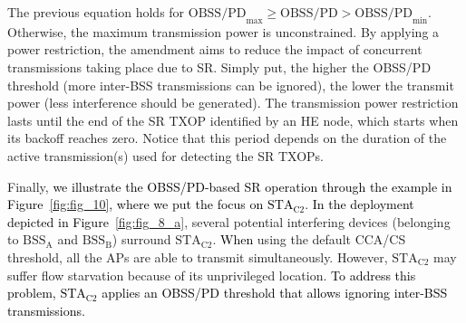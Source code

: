\documentclass[preprint,12pt]{elsarticle}
\theoremstyle{plain}
\begin{document}
The previous equation holds for $\text{OBSS/PD}_{\max} \geq \text{OBSS/PD} > \text{OBSS/PD}_{\min}$. Otherwise, the maximum transmission power is unconstrained. By applying a power restriction, the amendment aims to reduce the impact of concurrent transmissions taking place due to SR. Simply put, the higher the OBSS/PD threshold (more inter-BSS transmissions can be ignored), the lower the transmit power (less interference should be generated). The transmission power restriction lasts until the end of the SR TXOP identified by an HE node, which starts when its backoff reaches zero. Notice that this period depends on the duration of the active transmission(s) used for detecting the SR TXOPs. 

Finally, \textcolor{black}{we illustrate the OBSS/PD-based SR operation through the example in Figure~\ref{fig:fig_10}, where we put the focus on $\text{STA}_\text{C2}$}. \textcolor{black}{In the deployment depicted in Figure~\ref{fig:fig_8_a}}, several potential interfering devices (belonging to $\text{BSS}_\text{A}$ and $\text{BSS}_\text{B}$) surround $\text{STA}_\text{C2}$. \textcolor{black}{When} using the default CCA/CS threshold, all the APs are able to transmit simultaneously. However, $\text{STA}_\text{C2}$ may suffer flow starvation because of its unprivileged location. \textcolor{black}{To address this problem, $\text{STA}_\text{C2}$ applies an OBSS/PD threshold that allows ignoring inter-BSS transmissions.}
\end{document}

